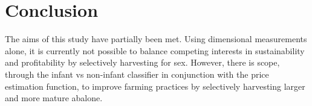 \documentclass[11pt, a4paper]{article}
\begin{document}
    \section*{Conclusion}

    The aims of this study have partially been met. Using dimensional measurements alone, it is currently not possible to balance competing interests in sustainability and profitability by selectively harvesting for sex. However, there is scope, through the infant vs non-infant classifier in conjunction with the price estimation function, to improve farming practices by selectively harvesting larger and more mature abalone.

    \printbibliography

    \nocite{*}
\end{document}
